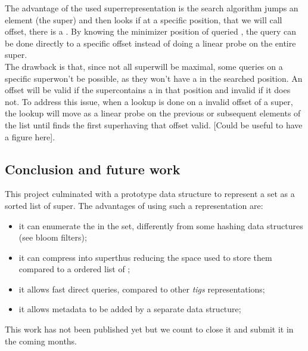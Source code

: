 The advantage of the used super\kmer representation is the search algorithm jumps an element (the super\kmer) and then looks if at a specific position, that we will call offset, there is a \kmer. By knowing the minimizer position of queried \kmer, the query can be done directly to a specific offset instead of doing a linear probe on the entire super\kmer.\\
The drawback is that, since not all super\kmers will be maximal, some queries on a specific super\kmer won't be possible, as they won't have a \kmer in the searched position. An offset will be valid if the super\kmer contains a \kmer in that position and invalid if it does not. To address this issue, when a lookup is done on a invalid offset of a super\kmer, the lookup will move as a linear probe on the previous or subsequent elements of the list until finds the first super\kmer having that offset valid.
[Could be useful to have a figure here].


\subsection{Conclusion and future work}
This project culminated with a prototype data structure to represent a \kmer set as a sorted list of super\kmers. The advantages of using such a representation are:
\begin{itemize}
	\item it can enumerate the \kmers in the set, differently from some hashing data structures (see bloom filters);
	\item it can compress \kmers into super\kmers thus reducing the space used to store them compared to a ordered list of \kmers;
	\item it allows fast direct queries, compared to other \emph{tigs} representations;
	\item it allows metadata to be added by a separate data structure;
\end{itemize}
This work has not been published yet but we count to close it and submit it in the coming months.

